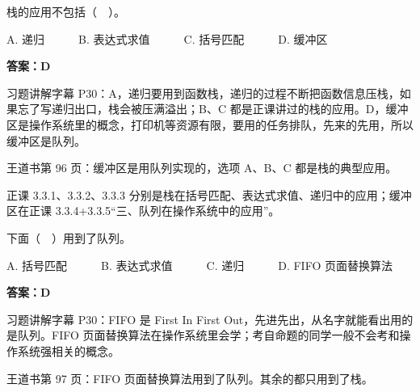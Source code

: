 \documentclass[10.5pt,a4paper,oneside]{article}
\newcommand{\hlred}[1]{\textcolor{wdred}{\bfseries #1}}
\begin{document}
\begin{questionbox}[01]

栈的应用不包括（　）。

A. 递归　　　B. 表达式求值　　　C. 括号匹配　　　D. 缓冲区

\end{questionbox}

\hlred{\textbf{答案：D}}

\begin{videobox}

习题讲解字幕
P30：A，递归要用到函数栈，递归的过程不断把函数信息压栈，如果忘了写递归出口，栈会被压满溢出；B、C
都是正课讲过的栈的应用。D，缓冲区是操作系统里的概念，打印机等资源有限，要用的任务排队，先来的先用，所以缓冲区是队列。

\end{videobox}

\begin{jiexibox}

王道书第 96 页：缓冲区是用队列实现的，选项 A、B、C 都是栈的典型应用。

\end{jiexibox}

\begin{recallbox}

正课 3.3.1、3.3.2、3.3.3
分别是栈在括号匹配、表达式求值、递归中的应用；缓冲区在正课
3.3.4+3.3.5“三、队列在操作系统中的应用”。

\end{recallbox}

\begin{questionbox}[03]

下面（　）用到了队列。

A. 括号匹配　　　B. 表达式求值　　　C. 递归　　　D. FIFO 页面替换算法

\end{questionbox}

\hlred{\textbf{答案：D}}

\begin{videobox}

习题讲解字幕 P30：FIFO 是 First In First
Out，先进先出，从名字就能看出用的是队列。FIFO
页面替换算法在操作系统里会学；考自命题的同学一般不会考和操作系统强相关的概念。

\end{videobox}

\begin{jiexibox}

王道书第 97 页：FIFO 页面替换算法用到了队列。其余的都只用到了栈。

\end{jiexibox}
\end{document}
